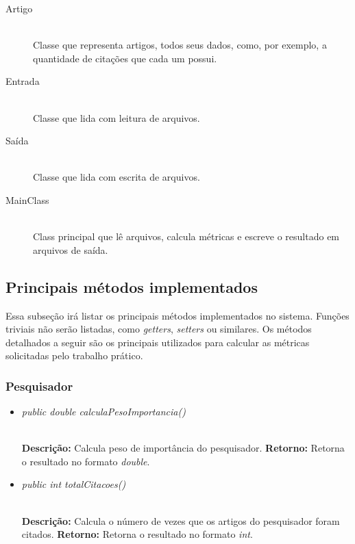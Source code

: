\documentclass[12pt]{article}
\begin{document}
\begin{description}
\item[Artigo] \hfill \\
		Classe que representa artigos, todos seus dados, como, por exemplo, a quantidade de citações que cada um possui.

\item[Entrada] \hfill \\
		Classe que lida com leitura de arquivos.
\item[Saída] \hfill \\
		Classe que lida com escrita de arquivos.
\item[MainClass] \hfill \\
		Class principal que lê arquivos, calcula métricas e escreve o resultado em arquivos de saída.

\end{description}

\subsection{Principais métodos implementados}

Essa subseção irá listar os principais métodos implementados no sistema. Funções triviais não serão listadas, como \textit{getters}, \textit{setters} ou similares. Os métodos detalhados a seguir são os principais utilizados para calcular as métricas solicitadas pelo trabalho prático.


\subsubsection{Pesquisador}

\begin{itemize}
 \item \begin{large}\textit{public double calculaPesoImportancia()}\end{large}\\
 \subitem \textbf{Descrição:} Calcula peso de importância do pesquisador.
 \subitem \textbf{Retorno:} Retorna o resultado no formato \textit{double}.
\end{itemize}

\vspace{0.2 true cm}

\begin{itemize}
 \item \begin{large}\textit{public int totalCitacoes()}\end{large}\\
 \subitem \textbf{Descrição:} Calcula o número de vezes que os artigos do pesquisador foram citados.
 \subitem \textbf{Retorno:} Retorna o resultado no formato \textit{int}.
\end{itemize}
\end{document}
